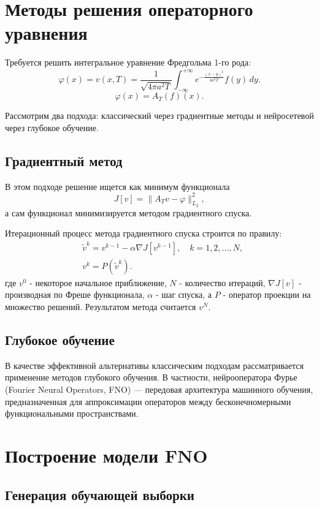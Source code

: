 \documentclass[12pt]{article} %
\begin{document}
\newpage
\section{Методы решения операторного уравнения}
Требуется решить интегральное уравнение Фредгольма 1-го рода:
\begin{equation}
\varphi(x) = v(x, T) = \frac{1}{\sqrt{4\pi a^2 T}}\int_{-\infty}^{+\infty}e^{-\frac{(x - y)^2}{4a^2T}}f(y) \, dy.
\end{equation}
$$\varphi(x) = A_T(f)(x).$$

Рассмотрим два подхода: классический через градиентные методы и нейросетевой через глубокое обучение.
\subsection{Градиентный метод}
В этом подходе решение ищется как минимум функционала
\begin{equation*}
J[v] = \|A_T v - \varphi\|^2_{L_2},
\end{equation*}
а сам функционал минимизируется методом градиентного спуска.

Итерационный процесс метода градиентного спуска строится по правилу:
\begin{align*}
    &\widetilde{v}^{k} = v^{k-1} - \alpha \nabla J[v^{k-1}], \, \, \ \ \ k = 1,2,...,N, \\
    &v^k = P(\widetilde{v}^{k}).
\end{align*}
где $v^0$ - некоторое начальное приближение, $N$ - количество итераций, $\nabla J[v]$ - производная по Фреше функционала, $\alpha$ - шаг спуска, а $P$ - оператор проекции на множество решений.
Результатом метода считается $v^N$.

\subsection{Глубокое обучение}
В качестве эффективной альтернативы классическим подходам рассматривается применение методов глубокого обучения.
В частности, нейрооператора Фурье (Fourier Neural Operators, FNO) — передовая архитектура машинного обучения, предназначенная для аппроксимации операторов между бесконечномерными функциональными пространствами.
\newpage
\section{Построение модели FNO}
\subsection{Генерация обучающей выборки}
\end{document}
